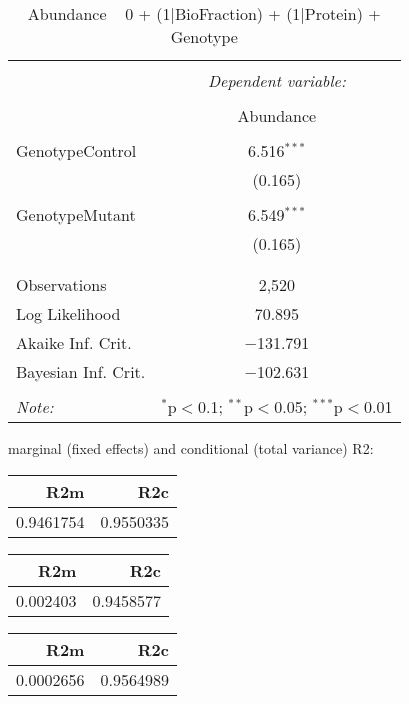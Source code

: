 \documentclass[11pt]{report}
\begin{document}
\begin{table}[!htbp] \centering 
  \caption{Abundance ~ 0 + (1|BioFraction) + (1|Protein) + Genotype} 
  \label{} 
\begin{tabular}{@{\extracolsep{5pt}}lc} 
\\[-1.8ex]\hline 
\hline \\[-1.8ex] 
 & \multicolumn{1}{c}{\textit{Dependent variable:}} \\ 
\cline{2-2} 
\\[-1.8ex] & Abundance \\ 
\hline \\[-1.8ex] 
 GenotypeControl & 6.516$^{***}$ \\ 
  & (0.165) \\ 
  & \\ 
 GenotypeMutant & 6.549$^{***}$ \\ 
  & (0.165) \\ 
  & \\ 
\hline \\[-1.8ex] 
Observations & 2,520 \\ 
Log Likelihood & 70.895 \\ 
Akaike Inf. Crit. & $-$131.791 \\ 
Bayesian Inf. Crit. & $-$102.631 \\ 
\hline 
\hline \\[-1.8ex] 
\textit{Note:}  & \multicolumn{1}{r}{$^{*}$p$<$0.1; $^{**}$p$<$0.05; $^{***}$p$<$0.01} \\ 
\end{tabular} 
\end{table} 
marginal (fixed effects) and conditional (total variance) R2:

\begin{tabular}{r|r}
\hline
R2m & R2c\\
\hline
0.9461754 & 0.9550335\\
\hline
\end{tabular}

\begin{tabular}{r|r}
\hline
R2m & R2c\\
\hline
0.002403 & 0.9458577\\
\hline
\end{tabular}

\begin{tabular}{r|r}
\hline
R2m & R2c\\
\hline
0.0002656 & 0.9564989\\
\hline
\end{tabular}
\end{document}
